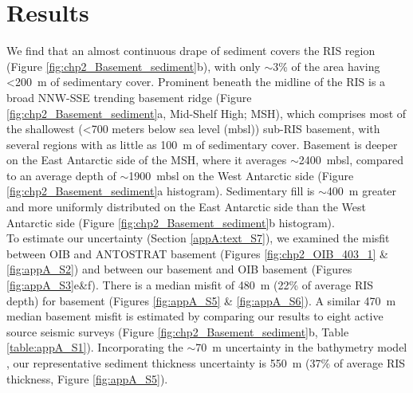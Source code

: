 \section{Results}

We find that an almost continuous drape of sediment covers the RIS region (Figure \ref{fig:chp2_Basement_sediment}b), with only $\sim$3\% of the area having \textless 200~m of sedimentary cover. Prominent beneath the midline of the RIS is a broad NNW-SSE trending basement ridge (Figure \ref{fig:chp2_Basement_sediment}a, Mid-Shelf High; MSH), which comprises most of the shallowest (\textless 700 meters below sea level (mbsl)) sub-RIS basement, with several regions with as little as 100~m of sedimentary cover. Basement is deeper on the East Antarctic side of the MSH, where it averages $\sim$2400~mbsl, compared to an average depth of $\sim$1900~mbsl on the West Antarctic side (Figure \ref{fig:chp2_Basement_sediment}a histogram). Sedimentary fill is $\sim$400~m greater and more uniformly distributed on the East Antarctic side than the West Antarctic side (Figure \ref{fig:chp2_Basement_sediment}b histogram).\\

To estimate our uncertainty (Section \ref{appA:text_S7}), we examined the misfit between OIB and ANTOSTRAT basement (Figures \ref{fig:chp2_OIB_403_1} \& \ref{fig:appA_S2}) and between our basement and OIB basement (Figures \ref{fig:appA_S3}e\&f). There is a median misfit of 480~m (22\% of average RIS depth) for basement (Figures \ref{fig:appA_S5} \& \ref{fig:appA_S6}). A similar 470~m median basement misfit is estimated by comparing our results to eight active source seismic surveys (Figure \ref{fig:chp2_Basement_sediment}b, Table \ref{table:appA_S1}). Incorporating the $\sim$70~m uncertainty in the bathymetry model \citep{tintoross2019}, our representative sediment thickness uncertainty is 550~m (37\% of average RIS thickness, Figure \ref{fig:appA_S5}).

